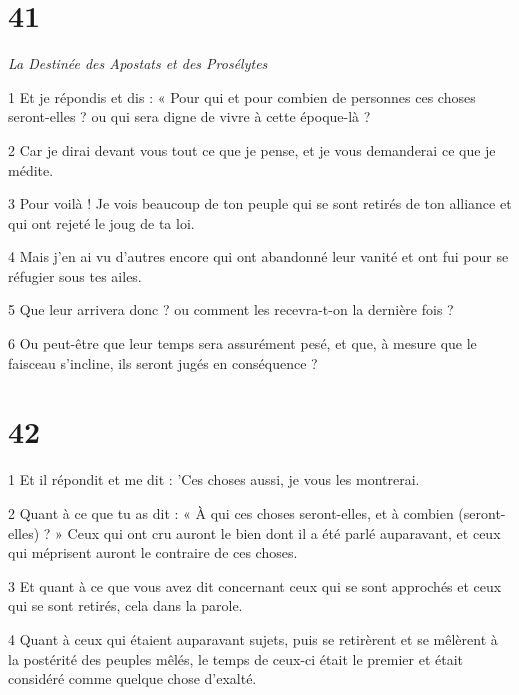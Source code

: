 \chapter{41}

\par \textit{La Destinée des Apostats et des Prosélytes}

\par 1 Et je répondis et dis : « Pour qui et pour combien de personnes ces choses seront-elles ? ou qui sera digne de vivre à cette époque-là ?

\par 2 Car je dirai devant vous tout ce que je pense, et je vous demanderai ce que je médite.

\par 3 Pour voilà ! Je vois beaucoup de ton peuple qui se sont retirés de ton alliance et qui ont rejeté le joug de ta loi.

\par 4 Mais j'en ai vu d'autres encore qui ont abandonné leur vanité et ont fui pour se réfugier sous tes ailes.

\par 5 Que leur arrivera donc ? ou comment les recevra-t-on la dernière fois ?

\par 6 Ou peut-être que leur temps sera assurément pesé, et que, à mesure que le faisceau s'incline, ils seront jugés en conséquence ?

\chapter{42}

\par 1 Et il répondit et me dit : 'Ces choses aussi, je vous les montrerai.

\par 2 Quant à ce que tu as dit : « À qui ces choses seront-elles, et à combien (seront-elles) ? » Ceux qui ont cru auront le bien dont il a été parlé auparavant, et ceux qui méprisent auront le contraire de ces choses.

\par 3 Et quant à ce que vous avez dit concernant ceux qui se sont approchés et ceux qui se sont retirés, cela dans la parole.

\par 4 Quant à ceux qui étaient auparavant sujets, puis se retirèrent et se mêlèrent à la postérité des peuples mêlés, le temps de ceux-ci était le premier et était considéré comme quelque chose d'exalté.

